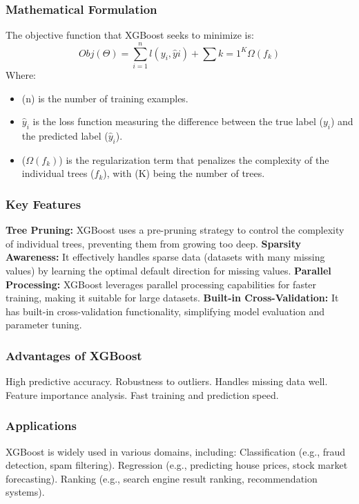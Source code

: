 \documentclass{ieeeojies}
\begin{document}
\subsubsection{Mathematical Formulation}
The objective function that XGBoost seeks to minimize is:
\begin{dmath*}
    Obj(\Theta) = \sum_{i=1}^n l(y_i, \hat{y}i) + \sum{k=1}^K \Omega(f_k)
\end{dmath*}
Where:
\begin{itemize}
    \item (n) is the number of training examples.
    \item \(\hat{y}_i\) is the loss function measuring the difference between the true label (\(y_i\)) and the predicted label (\(\hat{y}_i\)).
    \item (\(\Omega(f_k)\)) is the regularization term that penalizes the complexity of the individual trees (\(f_k\)), with (K) being the number of trees.
\end{itemize}
\subsubsection{Key Features}
\textbf{Tree Pruning:} XGBoost uses a pre-pruning strategy to control the complexity of individual trees, preventing them from growing too deep.
\textbf{Sparsity Awareness:} It effectively handles sparse data (datasets with many missing values) by learning the optimal default direction for missing values.
\textbf{Parallel Processing:} XGBoost leverages parallel processing capabilities for faster training, making it suitable for large datasets.
\textbf{Built-in Cross-Validation:} It has built-in cross-validation functionality, simplifying model evaluation and parameter tuning.
\subsubsection{Advantages of XGBoost}
High predictive accuracy.
Robustness to outliers.
Handles missing data well.
Feature importance analysis.
Fast training and prediction speed.
\subsubsection{Applications}
XGBoost is widely used in various domains, including:
Classification (e.g., fraud detection, spam filtering).
Regression (e.g., predicting house prices, stock market forecasting).
Ranking (e.g., search engine result ranking, recommendation systems).
\end{document}
